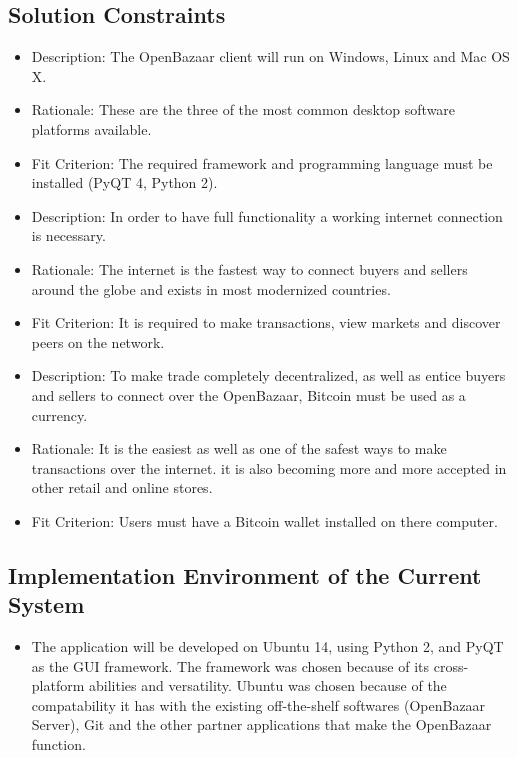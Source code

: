 \documentclass{article}
\begin{document}
\subsection{Solution Constraints}
\begin{itemize}

\item
Description: The OpenBazaar client will run on Windows, Linux and Mac OS X. 

\item
Rationale: These are the three of the most common desktop software platforms available. 

\item
Fit Criterion: The required framework and programming language must be installed (PyQT 4, Python 2).

\item
Description: In order to have full functionality a working internet connection is necessary.

\item
Rationale: The internet is the fastest way to connect buyers and sellers around the globe and exists in most modernized countries.

\item
Fit Criterion: It is required to make transactions, view markets and discover peers on the network.

\item
Description: To make trade completely decentralized, as well as entice buyers and sellers to connect over the OpenBazaar, Bitcoin must be used as a currency. 

\item
Rationale: It is the easiest as well as one of the safest ways to make transactions over the internet. it is also becoming more and more accepted in other retail and online stores. 

\item
Fit Criterion: Users must have a Bitcoin wallet installed on there computer. 

\end{itemize}

\subsection{Implementation Environment of the Current System}

\begin{itemize}
\item
The application will be developed on Ubuntu 14, using Python 2, and PyQT as the GUI framework. The framework was chosen because of its cross-platform abilities and versatility. Ubuntu was chosen because of the compatability it has with the existing off-the-shelf softwares (OpenBazaar Server), Git and the other partner applications that make the OpenBazaar function. 
\end{itemize}
\end{document}
